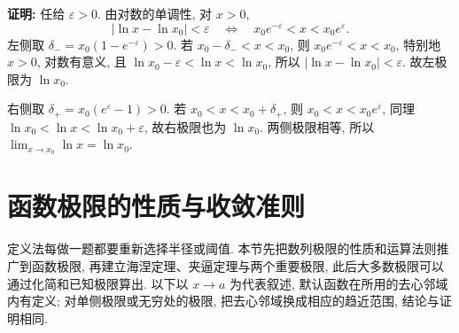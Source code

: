 \documentclass[UTF8,openany]{ctexbook}
\theoremstyle{chinesetextbook}
\newenvironment{cnproof}{\par\indent\textbf{证明:} \ignorespaces}{\par}
\begin{document}
\begin{cnproof}
任给 $\varepsilon>0$. 由对数的单调性, 对 $x>0$,
\[
|\ln x-\ln x_0|<\varepsilon
\quad\Longleftrightarrow\quad
x_0e^{-\varepsilon}<x<x_0e^{\varepsilon}.
\]
左侧取 $\delta_-=x_0(1-e^{-\varepsilon})>0$. 若 $x_0-\delta_-<x<x_0$, 则 $x_0e^{-\varepsilon}<x<x_0$, 特别地 $x>0$, 对数有意义, 且 $\ln x_0-\varepsilon<\ln x<\ln x_0$, 所以 $|\ln x-\ln x_0|<\varepsilon$. 故左极限为 $\ln x_0$.

右侧取 $\delta_+=x_0(e^{\varepsilon}-1)>0$. 若 $x_0<x<x_0+\delta_+$, 则 $x_0<x<x_0e^{\varepsilon}$, 同理 $\ln x_0<\ln x<\ln x_0+\varepsilon$, 故右极限也为 $\ln x_0$. 两侧极限相等, 所以 $\displaystyle\lim_{x\to x_0}\ln x=\ln x_0$.
\end{cnproof}

\section{函数极限的性质与收敛准则}
定义法每做一题都要重新选择半径或阈值. 本节先把数列极限的性质和运算法则推广到函数极限, 再建立海涅定理、夹逼定理与两个重要极限, 此后大多数极限可以通过化简和已知极限算出. 以下以 $x\to a$ 为代表叙述, 默认函数在所用的去心邻域内有定义; 对单侧极限或无穷处的极限, 把去心邻域换成相应的趋近范围, 结论与证明相同.
\end{document}
